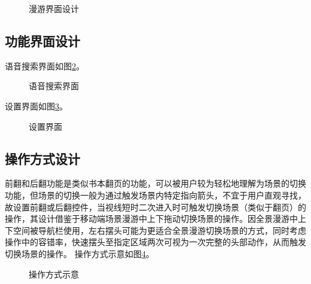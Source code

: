 \begin{figure}[htp]
\centering
{}
\caption{漫游界面设计}
\label{fig:scenery}
\end{figure}

\subsection{功能界面设计}

语音搜索界面如图\ref{fig:d-04}。

\begin{figure}[htp]
\centering
{}
\caption{语音搜索界面}
\label{fig:d-04}
\end{figure}

设置界面如图\ref{fig:d-05}。

\begin{figure}[htp]
\centering
{}
\caption{设置界面}
\label{fig:d-05}
\end{figure}

\subsection{操作方式设计}

前翻和后翻功能是类似书本翻页的功能，可以被用户较为轻松地理解为场景的切换功能，但场景的切换一般为通过触发场景内特定指向箭头，不宜于用户直观寻找，故设置前翻或后翻控件，当视线短时二次进入时可触发切换场景（类似于翻页）的操作，其设计借鉴于移动端场景漫游中上下拖动切换场景的操作。因全景漫游中上下空间被导航栏使用，左右摆头可能为更适合全景漫游切换场景的方式，同时考虑操作中的容错率，快速摆头至指定区域两次可视为一次完整的头部动作，从而触发切换场景的操作。
操作方式示意如图\ref{fig:d-09}。

\begin{figure}[htp]
\centering
{}
\caption{操作方式示意}
\label{fig:d-09}
\end{figure}